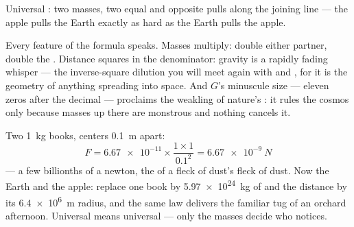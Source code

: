 \begin{omfigure}

{\small Universal : two masses, two equal and
opposite pulls along the joining line --- the apple pulls the
Earth exactly as hard as the Earth pulls the apple.}
\end{omfigure}

\begin{example}\label{ex:g9:gravitation:reading}
Every feature of the formula speaks. Masses multiply: double
either partner, double the . Distance squares in the
denominator: gravity is a rapidly fading whisper --- the
inverse-square dilution you will meet again with  and
, for it is the geometry of anything spreading into
space. And $G$'s minuscule size --- eleven zeros after the
decimal --- proclaims  the weakling of nature's
: it rules the cosmos only because masses up there are
monstrous and nothing cancels it.
\end{example}

\begin{example}\label{ex:g9:gravitation:books}
Two \qty{1}{kg} books, centers \qty{0.1}{m} apart:
\[
F = \num{6.67e-11} \times \frac{1 \times 1}{0.1^2}
= \qty{6.67e-9}{N}
\]
--- a few billionths of a newton, the  of a fleck of
dust's fleck of dust. Now the Earth and the apple: replace one
book by \qty{5.97e24}{kg} of  and the distance by its
\qty{6.4e6}{m} radius, and the same law delivers the familiar
tug of an orchard afternoon. Universal means universal ---
only the masses decide who notices.
\end{example}

